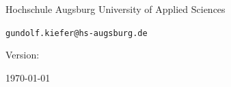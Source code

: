 \begin{titlepage}
		\begin{center}
			\textsf{\large{}Hochschule Augsburg \textendash{} University of Applied
				Sciences}\\
			\par\end{center}{\large \par}
		
		\begin{center}
			\texttt{\large{}gundolf.kiefer@hs-augsburg.de}
			\par\end{center}{\large \par}

		
		\begin{center}
			\textsf{\vfill}
			\par\end{center}
		
		\begin{center}
			\textsf{\large{}Version: \gitversion}
			\par\end{center}{\LARGE \par}

		\begin{center}
			\textsf{\large{}\today \\}
			\par\end{center}{\large \par}

		\begin{center}
			\vfill ~ \vfill
			\par\end{center}

	\end{titlepage}

